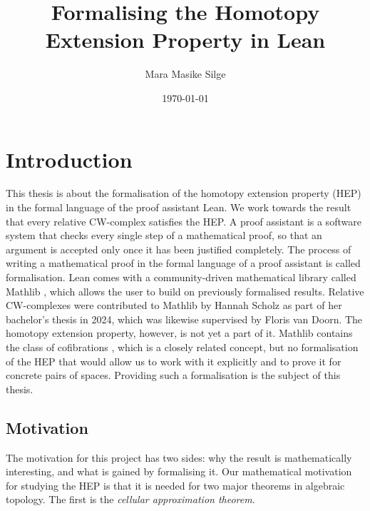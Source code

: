 \documentclass[11pt, a4paper, english]{article}
\author{Mara Masike Silge}
\date{\today}
\title{Formalising the Homotopy Extension Property in Lean}
\theoremstyle{plain}
\theoremstyle{definition}
\theoremstyle{remark}
\numberwithin{equation}{section}
\numberwithin{theorem}{section}
\begin{document}
\maketitle

\tableofcontents

\clearpage
\thispagestyle{empty}\mbox{}

\clearpage
\section{Introduction} \label{section:Introduction}
This thesis is about the formalisation of the homotopy extension property (HEP) in the formal language of the proof assistant Lean. We work towards the result that every relative CW-complex satisfies the HEP. A proof assistant is a software system that checks every single step of a mathematical proof, so that an argument is accepted only once it has been justified completely. The process of writing a mathematical proof in the formal language of a proof assistant is called formalisation. Lean comes with a community-driven mathematical library called Mathlib \cite{mathlibPaper}, which allows the user to build on previously formalised results. Relative CW-complexes were contributed to Mathlib by Hannah Scholz \cite{SCH01} as part of her bachelor's thesis in 2024, which was likewise supervised by Floris van Doorn. The homotopy extension property, however, is not yet a part of it. Mathlib contains the class of cofibrations \href{https://github.com/leanprover-community/mathlib4/blob/e7b8da838099d0bfea089b70a448e3c9b6cdbffd/Mathlib/AlgebraicTopology/ModelCategory/CategoryWithCofibrations.lean#L35-L39}{}, which is a closely related concept, but no formalisation of the HEP that would allow us to work with it explicitly and to prove it for concrete pairs of spaces. Providing such a formalisation is the subject of this thesis.

\subsection*{Motivation} 
The motivation for this project has two sides: why the result is mathematically interesting, and what is gained by formalising it. 
Our mathematical motivation for studying the HEP is that it is needed for two major theorems in algebraic topology. The first is the \emph{cellular approximation theorem}.
\end{document}
